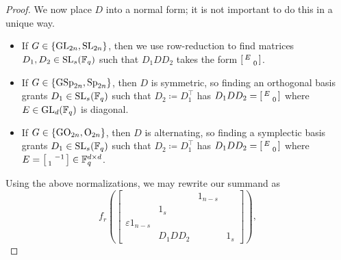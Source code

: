 \begin{proof}
	We now place $D$ into a normal form; it is not important to do this in a unique way.
	\begin{itemize}
		\item If $G\in\{\mathrm{GL}_{2n},\mathrm{SL}_{2n}\}$, then we use row-reduction to find matrices $D_1,D_2\in\mathrm{SL}_{s}(\mathbb F_q)$ such that $D_1DD_2$ takes the form $\begin{bsmallmatrix}
			E \\ & 0
		\end{bsmallmatrix}$. %
		\item If $G\in\{\mathrm{GSp}_{2n},\mathrm{Sp}_{2n}\}$, then $D$ is symmetric, so finding an orthogonal basis grants $D_1\in\mathrm{SL}_s(\mathbb F_q)$ such that $D_2\coloneqq D_1^\intercal$ has $D_1DD_2=\begin{bsmallmatrix}
			E \\ & 0
		\end{bsmallmatrix}$ where $E\in\mathrm{GL}_d(\mathbb F_q)$ is diagonal.
		\item If $G\in\{\mathrm{GO}_{2n},\mathrm{O}_{2n}\}$, then $D$ is alternating, so finding a symplectic basis
        grants $D_1\in\mathrm{SL}_s(\mathbb F_q)$ such that $D_2\coloneqq D_1^\intercal$ has $D_1DD_2=\begin{bsmallmatrix}
			E \\ & 0
		\end{bsmallmatrix}$ where $E=\begin{bsmallmatrix}
			& -1 \\ 1
		\end{bsmallmatrix}\in\mathbb F_q^{d\times d}$.
	\end{itemize}
    Using the above normalizations, we may rewrite our summand as
    \[f_r\left(\begin{bmatrix}
		&& 1_{n-s} \\ & 1_s \\
		\varepsilon1_{n-s} &   &   \\ & D_1 DD_2 &   & 1_s
	\end{bmatrix}\right),\]

\end{proof}
